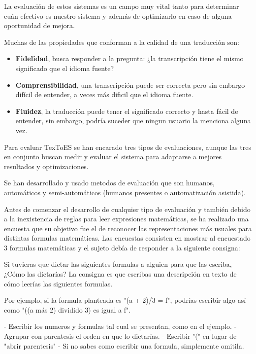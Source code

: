 La evaluación de estos sistemas es un campo muy vital tanto para determinar cuán efectivo es nuestro sistema y además de optimizarlo en caso de alguna oportunidad de mejora.

Muchas de las propiedades que conforman a la calidad de una traducción son:
\begin{itemize}
\item \textbf{Fidelidad}, busca responder a la pregunta: ¿la transcripción tiene el mismo significado que el idioma fuente?
\item \textbf{Comprensibilidad}, una transcripción puede ser correcta pero sin embargo difícil de entender, a veces más dificil que el idioma fuente.
\item \textbf{Fluidez}, la traducción puede tener el significado correcto y hasta fácil de entender, sin embargo, podría suceder que ningun usuario la menciona alguna vez.
\end{itemize}

Para evaluar TexToES se han encarado tres tipos de evaluaciones, aunque las tres en conjunto buscan medir y evaluar el sistema para adaptarse a mejores resultados y optimizaciones.

Se han desarrollado y usado metodos de evaluación que son humanos, automáticos y semi-automáticos (humanos presentes o automatización asistida).

Antes de comenzar el desarrollo de cualquier tipo de evaluación y también debido a la inexistencia de reglas para leer expresiones matemáticas, se ha realizado una encuesta que su objetivo fue el de reconocer las representaciones más usuales para distintas formulas matemáticas. Las encuestas consisten en mostrar al encuestado 3 formulas matemáticas y el sujeto debía de responder a la siguiente consigna:\\

\begin{tcolorbox}
Si tuvieras que dictar las siguientes formulas a alguien para que las escriba, ¿Cómo las dictarías?
La consigna es que escribas una descripción en texto de cómo leerías las siguientes formulas.

Por ejemplo, si la formula planteada es "(a + 2)/3 = f", podrías escribir algo así como "((a más 2) dividido 3) es igual a f".

- Escribir los numeros y formulas tal cual se presentan, como en el ejemplo.
- Agrupar con parentesis el orden en que lo dictarías.
- Escribir "(" en lugar de "abrir parentesis"
- Si no sabes como escribir una formula, simplemente omitila.
\end{tcolorbox}

